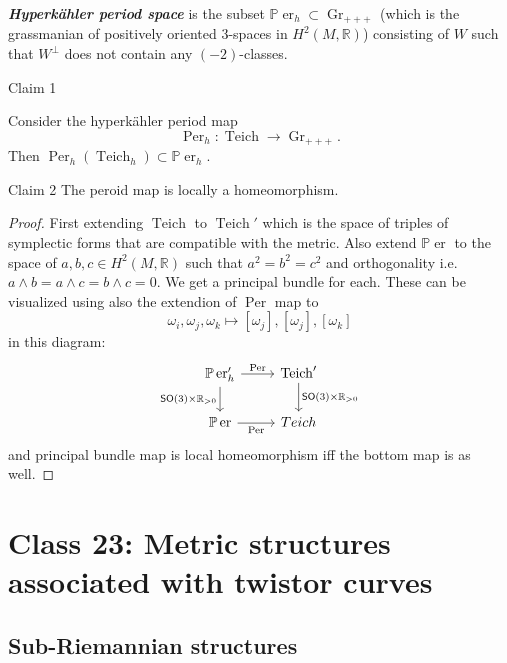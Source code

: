 \begin{defn}\leavevmode
	\textit{\textbf{Hyperkähler period space}} is the subset $\mathbb{P}\operatorname{er}_h \subset \operatorname{Gr}_{+ + +}$ (which is the grassmanian of positively oriented 3-spaces in $H^{2}(M,\mathbb{R})$) consisting of $W$ such that $W^\perp$ does not contain any $(-2)$-classes.
\end{defn}

\begin{thing4}{Claim 1}\leavevmode
	
	Consider the hyperkähler period map
	\[\operatorname{P er}_h:\operatorname{Teich}\longrightarrow \operatorname{Gr}_{+ + +}.\]
	Then $\operatorname{Per}_h(\operatorname{Teich}_h) \subset \mathbb{P}\operatorname{er}_h$.
\end{thing4}


\begin{thing4}{Claim 2}\leavevmode
	The peroid map is locally a homeomorphism.
\end{thing4}

\begin{proof}\leavevmode
First extending $\operatorname{Teich}$ to $\operatorname{Teich}'$ which is the space of triples of symplectic forms that are compatible with the metric. Also extend $\mathbb{P}\operatorname{er}$ to the space of $a,b,c \in H^{2}(M,\mathbb{R})$ such that $a^2=b^2=c^2$ and orthogonality i.e.  $a\wedge b=a \wedge c=b \wedge c=0$. We get a principal bundle for each. These can be visualized using also the extendion of $\operatorname{P er}$ map to
\[\omega_i, \omega_j, \omega_k\longmapsto [\omega_j],[\omega_j],[\omega_k]\]
in this diagram:
\[\begin{tikzcd}
	\mathbb{P}\operatorname{er}'_h\arrow[r,"\operatorname{P er}"]\arrow[d,"\mathsf{SO}(3)\times\mathbb{R}_{>0}",swap]&\operatorname{Teich}'\arrow[d,"\mathsf{SO}(3)\times\mathbb{R}_{>0}"]\\
	\mathbb{P}\operatorname{er}\arrow[r,swap,"\operatorname{P er}"]&Teich 
\end{tikzcd}\]
and principal bundle map is local homeomorphism iff the bottom map is as well.
\end{proof}

\section{Class 23: Metric structures associated with twistor curves}

\subsection{Sub-Riemannian structures}

